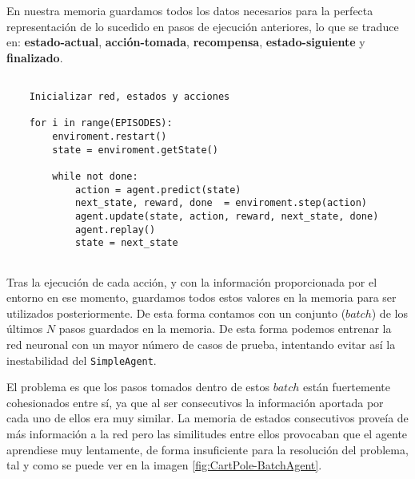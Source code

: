 En nuestra memoria guardamos todos los datos necesarios para la perfecta representación de lo sucedido en pasos de ejecución anteriores, lo que se traduce en: \textbf{estado-actual}, \textbf{acción-tomada}, \textbf{recompensa}, \textbf{estado-siguiente} y \textbf{finalizado}.

    


\begin{minipage}{0.9\linewidth}%
    \begin{lstlisting}[frame=tb, caption=Pseudocódigo BatchAgent, inputencoding=latin1, label=code:cartpole_drl2]
    
    Inicializar red, estados y acciones
    
    for i in range(EPISODES):
        enviroment.restart()
        state = enviroment.getState()
        
        while not done:
            action = agent.predict(state)
            next_state, reward, done  = enviroment.step(action)
            agent.update(state, action, reward, next_state, done)
            agent.replay()
            state = next_state
        
    \end{lstlisting}%
\end{minipage}

Tras la ejecución de cada acción, y con la información proporcionada por el entorno en ese momento, guardamos todos estos valores en la memoria para ser utilizados posteriormente. De esta forma contamos con un conjunto ($batch$) de los últimos $N$ pasos guardados en la memoria. De esta forma podemos entrenar la red neuronal con un mayor número de casos de prueba, intentando evitar así la inestabilidad del \texttt{SimpleAgent}.

El problema es que los pasos tomados dentro de estos $batch$ están fuertemente cohesionados entre sí, ya que al ser consecutivos la información aportada por cada uno de ellos era muy similar. La memoria de estados consecutivos proveía de más información a la red pero las similitudes entre ellos provocaban que el agente aprendiese muy lentamente, de forma insuficiente para la resolución del problema, tal y como se puede ver en la imagen \ref{fig:CartPole-BatchAgent}.

